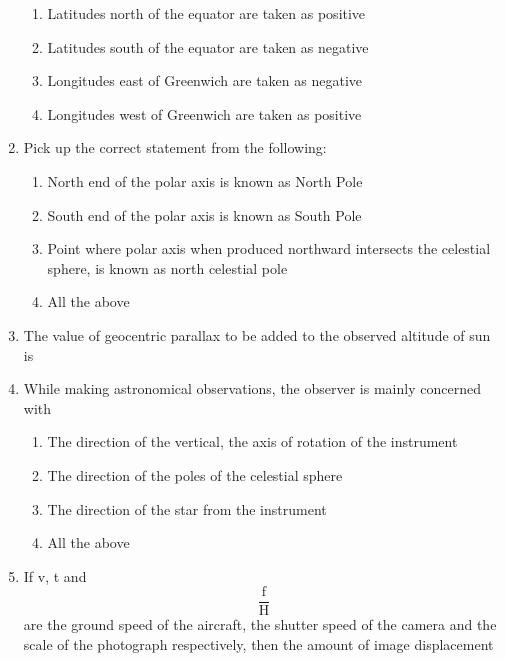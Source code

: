 \documentclass[11pt,a4paper]{article}
\begin{document}
\begin{enumerate}
\begin{enumerate}[label=\Alph*.]
\item{Latitudes north of the equator are taken as positive}
\item{Latitudes south of the equator are taken as negative}
\item{Longitudes east of Greenwich are taken as negative}
\item{Longitudes west of Greenwich are taken as positive}
\end{enumerate}
\item{Pick up the correct statement from the following:}
\begin{enumerate}[label=\Alph*.]
\item{North end of the polar axis is known as North Pole}
\item{South end of the polar axis is known as South Pole}
\item{Point where polar axis when produced northward intersects the celestial sphere, is known as north celestial pole}
\item{All the above}
\end{enumerate}
\item{The value of geocentric parallax to be added to the observed altitude of sun is}
\\
\item{While making astronomical observations, the observer is mainly concerned with}
\begin{enumerate}[label=\Alph*.]
\item{The direction of the vertical, the axis of rotation of the instrument}
\item{The direction of the poles of the celestial sphere}
\item{The direction of the star from the instrument}
\item{All the above}
\end{enumerate}
\item{If v, t and $$\frac{{\text{f}}}{{\text{H}}}$$ are the ground speed of the aircraft, the shutter speed of the camera and the scale of the photograph respectively, then the amount of image displacement}

\end{enumerate}
\end{document}
